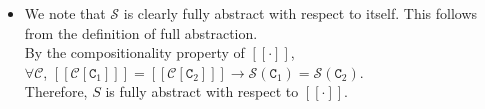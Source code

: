 \documentclass{article}
\newcommand{\C}{\mathtt{C}}
\begin{document}
\begin{enumerate}
\begin{itemize}
\item We note that $\mathcal{S}$ is clearly fully abstract with respect to
itself. This follows from the definition of full abstraction.\\

	By the compositionality property of $[[\cdot]]$,\\
	
	$\forall \mathcal{C}$, $[[\mathcal{C}[\C_1]]] = [[\mathcal{C}[\C_2]]]
	\rightarrow
	\mathcal{S}(\C_1) = \mathcal{S}(\C_2) $.\\

	Therefore, $S$ is fully abstract with respect to $[[\cdot]]$.

\end{itemize}  
  
\end{enumerate}


\end{document}
